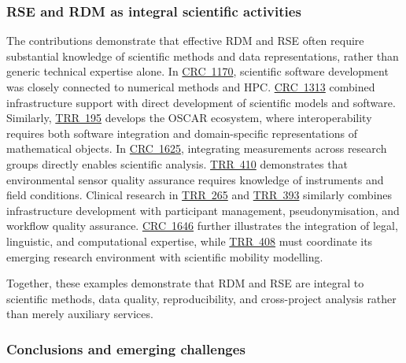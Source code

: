 \documentclass{eceasst}
\begin{document}
\subsubsection{RSE and RDM as integral scientific activities}
The contributions demonstrate that effective
RDM and RSE often require substantial knowledge
of scientific methods and data representations,
rather than generic technical expertise alone.
In \hyperref[subsec:crc1170]{CRC~1170},
scientific software development was closely
connected to numerical methods and HPC.
\hyperref[subsec:crc1313]{CRC~1313} combined
infrastructure support with direct development
of scientific models and software.
Similarly, \hyperref[subsec:trr195]{TRR~195}
develops the OSCAR ecosystem, where interoperability
requires both software integration and domain-specific
representations of mathematical objects.
In \hyperref[subsec:crc1625]{CRC~1625},
integrating measurements across research groups
directly enables scientific analysis.
\hyperref[subsec:trr410]{TRR~410} demonstrates
that environmental sensor quality assurance
requires knowledge of instruments and field
conditions.
Clinical research in \hyperref[subsec:trr265]{TRR~265} and
\hyperref[subsec:trr393]{TRR~393} similarly
combines infrastructure development with
participant management, pseudonymisation,
and workflow quality assurance.
\hyperref[subsec:crc1646]{CRC~1646} further
illustrates the integration of legal, linguistic,
and computational expertise, while
\hyperref[subsec:trr408]{TRR~408} must coordinate
its emerging research environment with scientific
mobility modelling.

Together, these examples demonstrate that RDM and
RSE are integral to scientific methods, data
quality, reproducibility, and cross-project
analysis rather than merely auxiliary services.


\subsubsection{Conclusions and emerging challenges}
\end{document}
